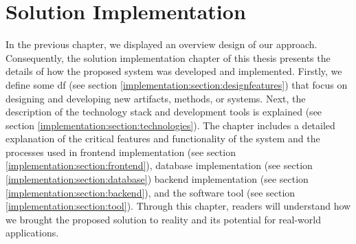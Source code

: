 
\chapter{Solution Implementation}

\ifpdf
    \graphicspath{{Chapters/Implementation/Figs/}{Chapters/Implementation/Figs/}{Chapters/Implementation/Figs/}}
\else
    \graphicspath{{Chapters/Implementation/Figs/}{Chapters/Implementation/Figs/}}
\fi
In the previous chapter, we displayed an overview design of our approach.
Consequently, the solution implementation chapter of this thesis presents the details of how the proposed system was developed and implemented.
Firstly, we define some \ac{df} (see section \ref{implementation:section:designfeatures}) that focus on designing and developing new artifacts, methods, or systems.
Next, the description of the technology stack and development tools is explained (see section \ref{implementation:section:technologies}).
The chapter includes a detailed explanation of the critical features and functionality of the system and the processes used in frontend implementation (see section \ref{implementation:section:frontend}), database implementation (see section \ref{implementation:section:database}) backend implementation (see section \ref{implementation:section:backend}), and the software tool (see section \ref{implementation:section:tool}).
Through this chapter, readers will understand how we brought the proposed solution to reality and its potential for real-world applications.

